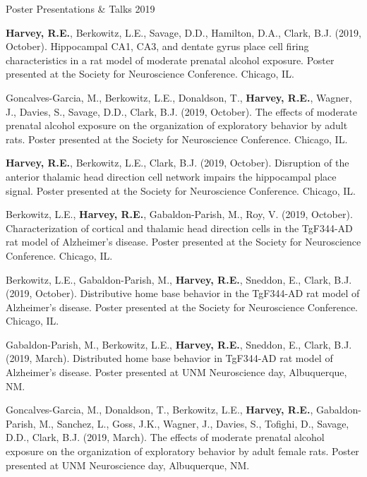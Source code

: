 


\begin{cventries}
\cventry
    {Poster Presentations \& Talks} %
    {} %
    {} %
    {2019} %
    {
      \begin{cvitems} %
      \setlength\itemsep{0.4em}
        \item {\textbf{Harvey, R.E.}, Berkowitz, L.E., Savage, D.D., Hamilton, D.A., Clark, B.J. (2019, October). Hippocampal CA1, CA3, and dentate gyrus place cell firing characteristics in a rat model of moderate prenatal alcohol exposure. Poster presented at the Society for Neuroscience Conference. Chicago, IL.} 
        \item {Goncalves-Garcia, M., Berkowitz, L.E., Donaldson, T., \textbf{Harvey, R.E.}, Wagner, J., Davies, S., Savage, D.D., Clark, B.J. (2019, October). The effects of moderate prenatal alcohol exposure on the organization of exploratory behavior by adult rats. Poster presented at the Society for Neuroscience Conference. Chicago, IL.}
        \item {\textbf{Harvey, R.E.}, Berkowitz, L.E., Clark, B.J. (2019, October). Disruption of the anterior thalamic head direction cell network impairs the hippocampal place signal. Poster presented at the Society for Neuroscience Conference. Chicago, IL.}
        \item {Berkowitz, L.E., \textbf{Harvey, R.E.}, Gabaldon-Parish, M., Roy, V. (2019, October). Characterization of cortical and thalamic head direction cells in the TgF344-AD rat model of Alzheimer’s disease. Poster presented at the Society for Neuroscience Conference. Chicago, IL.}
        \item {Berkowitz, L.E., Gabaldon-Parish, M., \textbf{Harvey, R.E.}, Sneddon, E., Clark, B.J. (2019, October). Distributive home base behavior in the TgF344-AD rat model of Alzheimer’s disease. Poster presented at the Society for Neuroscience Conference. Chicago, IL.}
        \item {Gabaldon-Parish, M., Berkowitz, L.E., \textbf{Harvey, R.E.}, Sneddon, E., Clark, B.J. (2019, March). Distributed home base behavior in TgF344-AD rat model of Alzheimer’s disease. Poster presented at UNM Neuroscience day, Albuquerque, NM.}
        \item {Goncalves-Garcia, M., Donaldson, T., Berkowitz, L.E., \textbf{Harvey, R.E.}, Gabaldon-Parish, M., Sanchez, L., Goss, J.K., Wagner, J., Davies, S., Tofighi, D., Savage, D.D., Clark, B.J. (2019, March). The effects of moderate prenatal alcohol exposure on the organization of exploratory behavior by adult female rats. Poster presented at UNM Neuroscience day, Albuquerque, NM.}
      \end{cvitems}
    }
\end{cventries}

